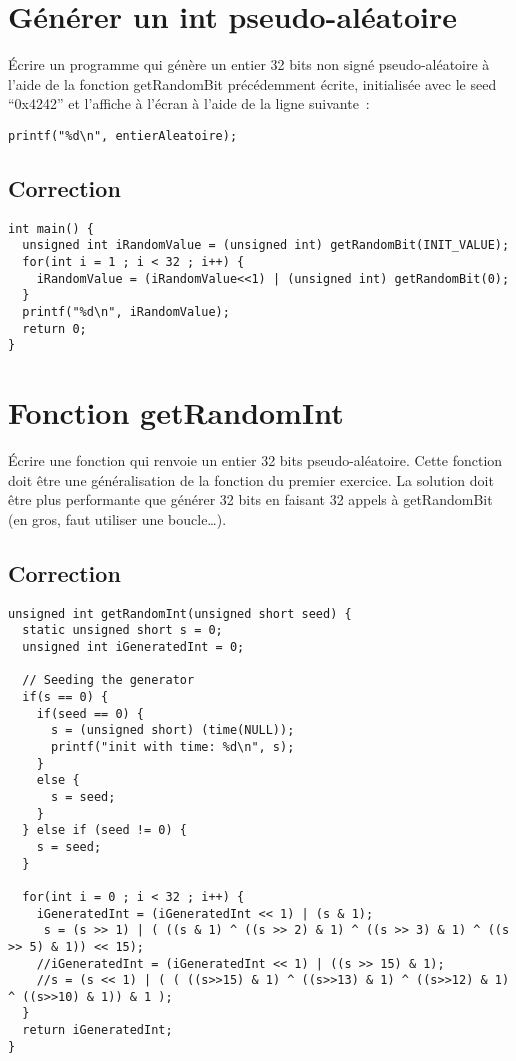 \documentclass[10pt]{article}
\begin{document}
\section{Générer un int pseudo-aléatoire}
\'Ecrire un programme qui génère un entier 32 bits non signé pseudo-aléatoire à l'aide de la fonction getRandomBit précédemment écrite, initialisée avec le seed ``0x4242'' et l'affiche à l'écran à l'aide de la ligne suivante~:
\begin{verbatim}
printf("%d\n", entierAleatoire);
\end{verbatim}

\subsection{Correction}
\begin{verbatim}
int main() {
  unsigned int iRandomValue = (unsigned int) getRandomBit(INIT_VALUE);
  for(int i = 1 ; i < 32 ; i++) {
    iRandomValue = (iRandomValue<<1) | (unsigned int) getRandomBit(0);
  } 
  printf("%d\n", iRandomValue);
  return 0; 
}
\end{verbatim}

\section{Fonction getRandomInt} 
\'Ecrire une fonction qui renvoie un entier 32 bits pseudo-aléatoire. Cette fonction doit être une généralisation de la fonction du premier exercice. 
La solution doit être plus performante que générer 32 bits en faisant 32 appels à getRandomBit (en gros, faut utiliser une boucle\ldots).

\subsection{Correction}
\begin{verbatim}
unsigned int getRandomInt(unsigned short seed) {
  static unsigned short s = 0;
  unsigned int iGeneratedInt = 0;

  // Seeding the generator
  if(s == 0) {
    if(seed == 0) {
      s = (unsigned short) (time(NULL));
      printf("init with time: %d\n", s);
    }
    else {
      s = seed;
    }
  } else if (seed != 0) {
    s = seed;
  }
  
  for(int i = 0 ; i < 32 ; i++) { 
    iGeneratedInt = (iGeneratedInt << 1) | (s & 1);
     s = (s >> 1) | ( ((s & 1) ^ ((s >> 2) & 1) ^ ((s >> 3) & 1) ^ ((s >> 5) & 1)) << 15);
    //iGeneratedInt = (iGeneratedInt << 1) | ((s >> 15) & 1);
    //s = (s << 1) | ( ( ((s>>15) & 1) ^ ((s>>13) & 1) ^ ((s>>12) & 1) ^ ((s>>10) & 1)) & 1 );
  }
  return iGeneratedInt;
}
\end{verbatim}
\end{document}
